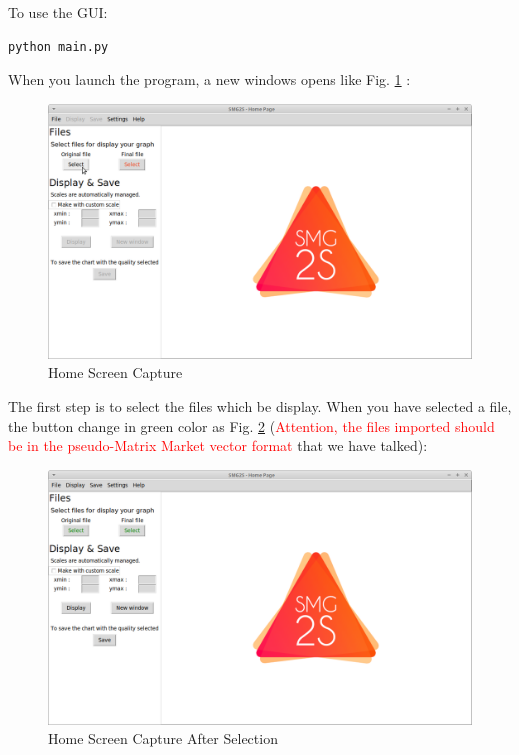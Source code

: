 \documentclass[a4paper, 10 pt]{report}
\begin{document}
	To use the GUI:
	\begin{lstlisting}[language=bash,frame=single]
   python main.py
    \end{lstlisting}

When you launch the program, a new windows opens like Fig. \ref{fig:Home Screen Capture} :

	\begin{figure}[htbp]
		\label{fig:Home Screen Capture}
		\caption{Home Screen Capture}
		\centering
		\includegraphics[width=12cm]{home.png}
	\end{figure}

The first step is to select the files which be display. When you have selected a file, the button change in green color as Fig. \ref{fig:Home Screen Capture After selection} (\textcolor{red}{Attention, the files imported should be in the pseudo-Matrix Market vector format} that we have talked):

\begin{figure}[htbp]
			\label{fig:Home Screen Capture After selection}
	\caption{Home Screen Capture After Selection}
		\centering
	\includegraphics[width=13cm]{home_ready.png}
\end{figure}
\end{document}
